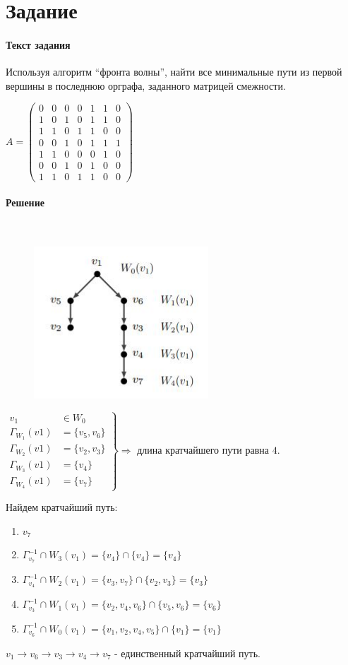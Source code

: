 \documentclass[a4paper, 12pt]{article}
\newcommand{\RNum}[1]{\uppercase\expandafter{\romannumeral #1\relax}}
\newcommand{\Amatrix}{
    \begin{pmatrix}
        0 & 0 & 0 & 0 & 1 & 1 & 0 \\
        1 & 0 & 1 & 0 & 1 & 1 & 0 \\
        1 & 1 & 0 & 1 & 1 & 0 & 0 \\
        0 & 0 & 1 & 0 & 1 & 1 & 1 \\
        1 & 1 & 0 & 0 & 0 & 1 & 0 \\
        0 & 0 & 1 & 0 & 1 & 0 & 0 \\
        1 & 1 & 0 & 1 & 1 & 0 & 0 
    \end{pmatrix}
}
\begin{document}
\section*{Задание \RNum{3}} 
\paragraph{Текст задания} Используя алгоритм “фронта волны”, найти все минимальные пути из первой вершины в
последнюю орграфа, заданного матрицей смежности.

$ A = \Amatrix $
\paragraph{Решение} $ $ %

\begin{figure}[h]
    \includegraphics{3_graph}
\end{figure}

$ \left. 
\begin{aligned}
    v_1 &\in W_0 \\ 
    \Gamma _{W_1}(v1) &= \{v_5, v_6\} \\
    \Gamma _{W_2}(v1) &= \{v_2, v_3\} \\
    \Gamma _{W_3}(v1) &= \{v_4\} \\
    \Gamma _{W_4}(v1) &= \{v_7\}
\end{aligned}
\right\} \Rightarrow $ длина кратчайшего пути равна $4$.

\noindent Найдем кратчайший путь:
\begin{enumerate} %
    \item $v_7$
    \item $ \Gamma_{v_7}^{-1} \cap W_3(v_1) = \{v_4\} \cap \{v_4\} = \{v_4\}$
    \item $ \Gamma_{v_4}^{-1} \cap W_2(v_1) = \{v_3, v_7\} \cap \{v_2, v_3\} = \{v_3\}$
    \item $ \Gamma_{v_3}^{-1} \cap W_1(v_1) = \{v_2, v_4, v_6\} \cap \{v_5, v_6\} = \{v_6\}$
    \item $ \Gamma_{v_6}^{-1} \cap W_0(v_1) = \{v_1, v_2, v_4, v_5\} \cap \{v_1\} = \{v_1\}$
\end{enumerate}
$ v_1 \rightarrow v_6 \rightarrow v_3 \rightarrow v_4 \rightarrow v_7$ - единственный кратчайший путь.
\end{document}
